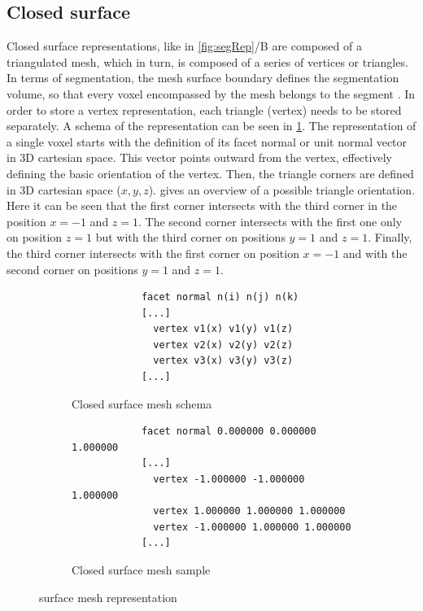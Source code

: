 \subsection{Closed surface}\label{s:b-closed-surface}
Closed surface representations, like in \cref{fig:segRep}/B are composed of a triangulated mesh,
which in turn, is composed of a series of vertices or triangles.
In terms of segmentation, the mesh surface boundary defines the segmentation volume,
so that every voxel encompassed by the mesh belongs to the segment \cite{delameMedialSurfaceMesh2012,weber3DSlicerPlatform2022,pinterPolymorphSegmentationRepresentation2019}.
In order to store a vertex representation, each triangle (vertex) needs to be stored separately.
A schema of the representation can be seen in \cref{fig:surfacemesh-schema}.
The representation of a single voxel starts with the definition of its facet normal or unit normal vector in 3D cartesian space.
This vector points outward from the vertex, effectively defining the basic orientation of the vertex.
Then, the triangle corners are defined in 3D cartesian space ($x,y,z$).
 gives an overview of a possible triangle orientation.
Here it can be seen that the first corner intersects with the third corner in the position
$x=-1$ and $z=1$.
The second corner intersects with the first one only on position $z=1$ but with the third corner on positions
$y=1$ and $z=1$.
Finally, the third corner intersects with the first corner on position $x=-1$ and
with the second corner on positions $y=1$ and $z=1$.

\begin{figure}[h] %
	\begin{subfigure}{0.49\textwidth}
		\begin{verbatim}
			facet normal n(i) n(j) n(k)
			[...]
			  vertex v1(x) v1(y) v1(z)
			  vertex v2(x) v2(y) v2(z)
			  vertex v3(x) v3(y) v3(z)
			[...]
		\end{verbatim}
		\caption{Closed surface mesh schema}\label{fig:surfacemesh-schema}
	\end{subfigure}
	\begin{subfigure}{0.49\textwidth}
		\begin{verbatim}
			facet normal 0.000000 0.000000 1.000000
			[...]
			  vertex -1.000000 -1.000000 1.000000
			  vertex 1.000000 1.000000 1.000000
			  vertex -1.000000 1.000000 1.000000
			[...]
		\end{verbatim}
		\caption{Closed surface mesh sample}\label{fig:surfacemesh}
	\end{subfigure}
	\caption{surface mesh representation}\label{fig:mesh-repesentation}
\end{figure}

